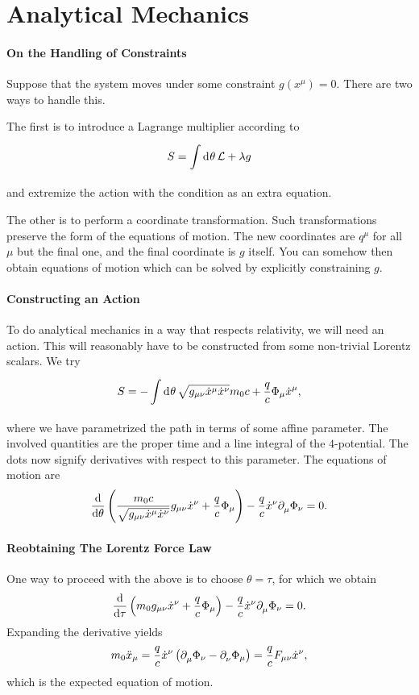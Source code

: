 \section{Analytical Mechanics}

\paragraph{On the Handling of Constraints}
Suppose that the system moves under some constraint $g(x^{\mu}) = 0$. There are two ways to handle this.

The first is to introduce a Lagrange multiplier according to
\begin{align*}
	S = \int\limits_{}^{}\dd[]{\theta}\mathcal{L} + \lambda g
\end{align*}
and extremize the action with the condition as an extra equation.

The other is to perform a coordinate transformation. Such transformations preserve the form of the equations of motion. The new coordinates are $q^{\mu}$ for all $\mu$ but the final one, and the final coordinate is $g$ itself. You can somehow then obtain equations of motion which can be solved by explicitly constraining $g$.

\paragraph{Constructing an Action}
To do analytical mechanics in a way that respects relativity, we will need an action. This will reasonably have to be constructed from some non-trivial Lorentz scalars. We try
\begin{align*}
	S = -\int\limits_{}^{}\dd[]{\theta}\sqrt{g_{\mu\nu}\dot{x}^{\mu}\dot{x}^{\nu}}m_{0}c + \frac{q}{c}\Phi_{\mu}\dot{x}^{\mu},
\end{align*}
where we have parametrized the path in terms of some affine parameter. The involved quantities are the proper time and a line integral of the $4$-potential. The dots now signify derivatives with respect to this parameter. The equations of motion are
\begin{align*}
	\dv{\theta}\left(\frac{m_{0}c}{\sqrt{g_{\mu\nu}\dot{x}^{\mu}\dot{x}^{\nu}}}g_{\mu\nu}\dot{x}^{\nu} + \frac{q}{c}\Phi_{\mu}\right) - \frac{q}{c}\dot{x}^{\nu}\partial^{}_{\mu}\Phi_{\nu} = 0.
\end{align*}

\paragraph{Reobtaining The Lorentz Force Law}
One way to proceed with the above is to choose $\theta = \tau$, for which we obtain
\begin{align*}
	\dv{\tau}\left(m_{0}g_{\mu\nu}\dot{x}^{\nu} + \frac{q}{c}\Phi_{\mu}\right) - \frac{q}{c}\dot{x}^{\nu}\partial^{}_{\mu}\Phi_{\nu} = 0.
\end{align*}
Expanding the derivative yields
\begin{align*}
	m_{0}\ddot{x}_{\mu} = \frac{q}{c}\dot{x}^{\nu}\left(\partial^{}_{\mu}\Phi_{\nu} - \partial^{}_{\nu}\Phi_{\mu}\right) = \frac{q}{c}F_{\mu\nu}\dot{x}^{\nu},
\end{align*}
which is the expected equation of motion.


